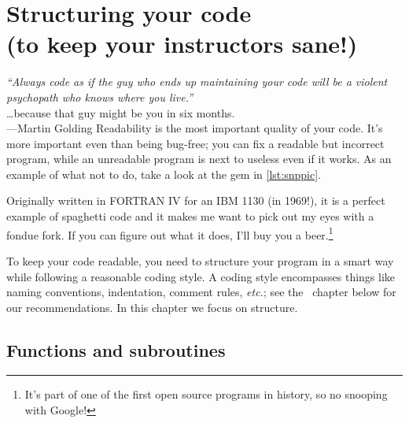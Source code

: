 \documentclass[openany,oneside]{report}
\newcommand{\Chapter}[2]{\chapter[#1]{#1\\[1ex]\Large#2}}
\renewenvironment{quote}{\list{}{\leftmargin=8\parindent}\item\relax}{\endlist}
\begin{document}

\Chapter{Structuring your code}{(to keep your instructors sane!)}
\label{chap:Structure}

\begin{quote}\small
  \emph{``Always code as if the guy who ends up maintaining your code will be a violent psychopath who knows where you live.''} \\ \ldots because that guy might be you in six months. \\ \hspace*{\fill}---Martin Golding
\end{quote}
Readability is the most important quality of your code.
It's more important even than being bug-free; you can fix a readable but incorrect program, while an unreadable program is next to useless even if it works.
As an example of what not to do, take a look at the gem in \autoref{lst:snppic}.

Originally written in FORTRAN IV for an IBM 1130 (in 1969!), it is a perfect example of spaghetti code and it makes me want to pick out my eyes with a fondue fork.
If you can figure out what it does, I'll buy you a beer.\footnote{It's part of one of the first open source programs in history, so no snooping with Google!}

To keep your code readable, you need to structure your program in a smart way while following a reasonable coding style.
A coding style encompasses things like naming conventions, indentation, comment rules, \emph{etc.}; see the ~chapter below for our recommendations.
In this chapter we focus on structure.

\section{Functions and subroutines}
\end{document}
